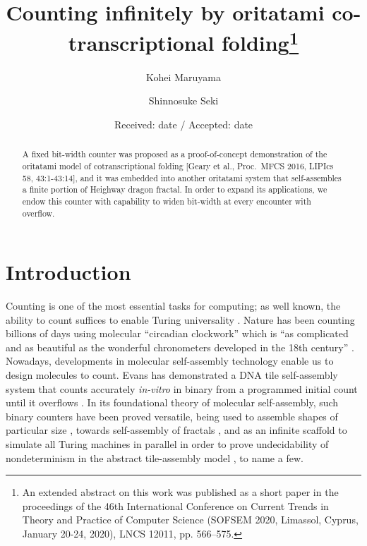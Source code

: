 \documentclass[twocolumn]{svjour3}
\begin{document}
\title{Counting infinitely by oritatami co-transcriptional folding\thanks{An extended abstract on this work was published as a short paper in the proceedings of the 46th International Conference on Current Trends in Theory and Practice of Computer Science (SOFSEM 2020, Limassol, Cyprus, January 20-24, 2020), LNCS 12011, pp. 566--575.}}

\author{
Kohei Maruyama\and
Shinnosuke Seki
}

\date{Received: date / Accepted: date}

\maketitle


\begin{abstract}
A fixed bit-width counter was proposed as a proof-of-concept demonstration of the oritatami model of cotranscriptional folding [Geary et al., Proc.~MFCS 2016, LIPIcs 58, 43:1-43:14], and it was embedded into another oritatami system that self-assembles a finite portion of Heighway dragon fractal. 
In order to expand its applications, we endow this counter with capability to widen bit-width at every encounter with overflow. 
\end{abstract}

	\section{Introduction}

Counting is one of the most essential tasks for computing; as well known, the ability to count suffices to enable Turing universality \cite{Minsky1967}. 
Nature has been counting billions of days using molecular ``circadian clockwork'' which is ``as complicated and as beautiful as the wonderful chronometers developed in the 18th century''  \cite{McClung2006}. 
Nowadays, developments in molecular self-assembly technology enable us to design molecules to count. 
Evans has demonstrated a DNA tile self-assembly system that counts accurately \textit{in-vitro} in binary from a programmed initial count until it overflows \cite{EvansPhD}. 
In its foundational theory of molecular self-assembly, such binary counters have been proved versatile, being used to assemble shapes of particular size \cite{AdChGoHu2001,RothemundWinfree2000}, towards self-assembly of fractals \cite{MasudaSekiUbukata2018}, and as an infinite scaffold to simulate all Turing machines in parallel in order to prove undecidability of nondeterminism in the abstract tile-assembly model \cite{BrChDoKaSe2013}, to name a few. 
\end{document}

